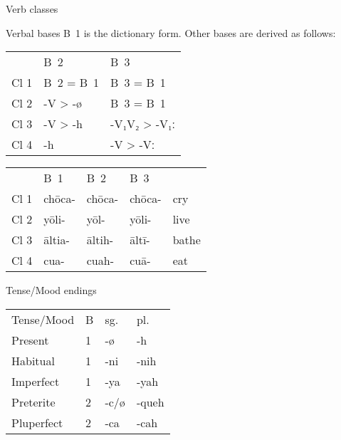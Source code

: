 \documentclass[12pt]{beamer}
\newcommand{\nah}[1]{\textcolor{nahgrn}{#1}}
\newcommand{\trs}[1]{\textcolor{nahblu}{#1}}
\begin{document}
\begin{frame}
\begin{columns}[t]
\begin{column}{.18\linewidth}
\begin{block}{Verb classes}
\begin{itemize}
        \end{itemize}
      \end{block}
      \begin{block}{Verbal bases}
        B~1 is the dictionary form. Other bases are derived as follows:
        \begin{tabular}{lll}
               & B~2           & B~3                \\
          Cl 1 & B~2 = B~1     & B~3 = B~1          \\
          Cl 2 & \nah{-V > -ø} & B~3 = B~1          \\
          Cl 3 & \nah{-V > -h} & \nah{-V₁V₂ > -V₁ː} \\
          Cl 4 & \nah{-h}      & \nah{-V > -Vː}
        \end{tabular}
      \end{block}
      \begin{example}
        \begin{tabular}{lllll}
               & B~1          & B~2          & B~3          &             \\
          Cl 1 & \nah{chōca-} & \nah{chōca-} & \nah{chōca-} & \trs{cry}   \\
          Cl 2 & \nah{yōli-}  & \nah{yōl-}   & \nah{yōli-}  & \trs{live}  \\
          Cl 3 & \nah{āltia-} & \nah{āltih-} & \nah{āltī-}  & \trs{bathe} \\
          Cl 4 & \nah{cua-}   & \nah{cuah-}  & \nah{cuā-}   & \trs{eat}
        \end{tabular}
      \end{example}
      \begin{block}{Tense/Mood endings}
        \begin{threeparttable}
          \begin{tabular}{llll}
            Tense/Mood  & B & sg.                & pl.                    \\
            Present     & 1 & \nah{-ø}           & \nah{-h}               \\
            Habitual    & 1 & \nah{-ni}\tnote{1} & \nah{-nih}\tnote{1}    \\
            Imperfect   & 1 & \nah{-ya}\tnote{2} & \nah{-yah}             \\
            Preterite   & 2 & \nah{-c/ø}\tnote{3}  & \nah{-queh}            \\
            Pluperfect  & 2 & \nah{-ca}          & \nah{-cah}             \\

\end{tabular}
\end{threeparttable}
\end{block}
\end{column}
\end{columns}
\end{frame}
\end{document}
